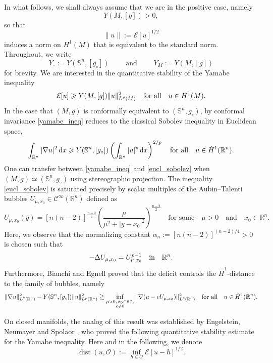 \documentclass[reqno,11pt]{amsart}
\numberwithin{equation}{section}
\theoremstyle{definition}
\theoremstyle{remark}
\newcommand{\ud}{\,\mathrm{d}}
\DeclareMathOperator{\dist}{dist}
\newcommand{\R}{\mathbb{R}}
\newcommand{\Ss}{\mathbb{S}}
\begin{document}
In what follows, we shall always assume that we are in the positive case, namely
\[
Y(M,[g]) > 0,
\]
so that 
\[\|u\| := \mathcal E[u]^{1/2}
\]
induces a norm on $H^1(M)$ that 
is equivalent to the standard norm. Throughout, 
we write 
\[ Y_\circ := Y(\Ss^n,[g_\circ]) \qquad \text{ and } \qquad Y_M := Y(M,[g])
\]
for brevity.
We are interested in the quantitative stability of the Yamabe inequality 
\begin{equation} \label{yamabe_ineq}
\mathcal{E}[u] \geqslant Y(M,[g]) \|u\|_{L^p(M)}^2 \quad {\rm for \ all} \quad u\in H^1(M).
\end{equation}
In the case that $(M,g)$ is conformally equivalent to $(\Ss^n, g_\circ)$, 
by conformal invariance \eqref{yamabe_ineq} reduces to the classical 
Sobolev inequality in Euclidean space, 
\begin{equation}\label{eucl_sobolev} 
\int_{\R^n} |\nabla u|^2 \ud x \geqslant Y(\Ss^n,[g_\circ]) 
\left(\int_{\R^n}|u|^p\ud x\right)^{2/p} \quad {\rm for \ all} \quad u \in \dot{H}^1(\R^n).
\end{equation} 
One can transfer between \eqref{yamabe_ineq} 
and \eqref{eucl_sobolev} when $(M,g) \simeq (\Ss^n, g_\circ)$ using stereographic 
projection. The 
inequality \eqref{eucl_sobolev}
is saturated precisely by scalar multiples of the Aubin--Talenti bubbles 
$U_{\mu,x_0}\in \mathcal{C}^\infty(\R^n)$ defined as 
\[
U_{\mu,x_0}(y) = 
[n(n-2)]^\frac{n-2}{4} \left(\frac{\mu}{\mu^2 + |y - x_0|^2}\right)^{\frac{n-2}{2}}
\quad \text{for some} \quad \mu > 0 \quad \text{and} \quad x_0 \in \R^n.
\]
Here, we observe that the normalizing constant $\alpha_n := [n(n-2)]^{(n-2)/4}>0$ is chosen such that 
\[
-\Delta U_{\mu, x_0} 
= U_{\mu, x_0}^{p-1} \quad {\rm in} \quad \R^n.
\]
Furthermore, Bianchi and Egnell \cite{BE}
proved that the deficit controls the $\dot{H}^1$-distance to the
family of bubbles, namely
\begin{equation*}
    \|\nabla u\|^2_{L^2(\R^n)} - Y(\Ss^n,[g_\circ]) \|u\|_{L^p(\R^n)}^2 \gtrsim 
    \inf_{\substack{\mu > 0,\, x_0 \in \R^n, \\ {c \neq 0}}} \|\nabla(u - 
    c U_{\mu,x_0})\|_{L^2(\R^n)}^2 \quad {\rm for \ all} \quad u \in \dot{H}^1(\R^n).
\end{equation*}

On closed manifolds, the analog of this result was established by Engelstein, Neumayer 
and Spolaor {\cite{ENS}}, who proved the following quantitative stability estimate for the Yamabe inequality.
Here and in the following, we denote 
\begin{equation}
    \label{dist definition}
    \dist(u, \mathscr{O}) := \inf_{h \in \mathscr{O}} \mathcal{E}[u-h]^{1/2} . 
\end{equation} 
\end{document}
